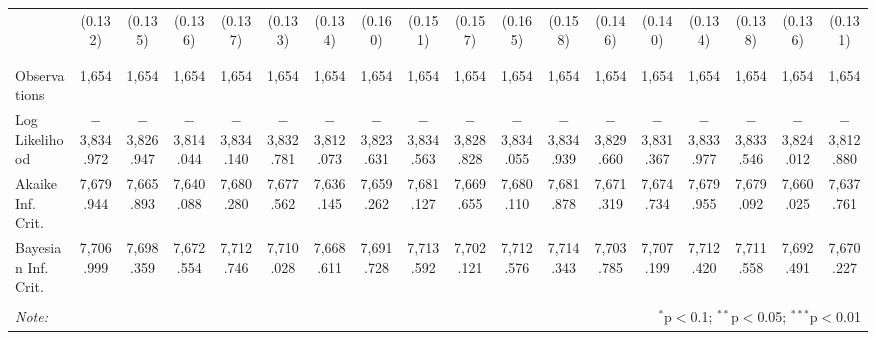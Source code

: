 \begin{table}[!htbp]
\begin{tabular}{@{\extracolsep{5pt}}lccccccccccccccccc}
  & (0.132) & (0.135) & (0.136) & (0.137) & (0.133) & (0.134) & (0.160) & (0.151) & (0.157) & (0.165) & (0.158) & (0.146) & (0.140) & (0.134) & (0.138) & (0.136) & (0.131) \\ 
  & & & & & & & & & & & & & & & & & \\ 
\hline \\[-1.8ex] 
Observations & 1,654 & 1,654 & 1,654 & 1,654 & 1,654 & 1,654 & 1,654 & 1,654 & 1,654 & 1,654 & 1,654 & 1,654 & 1,654 & 1,654 & 1,654 & 1,654 & 1,654 \\ 
Log Likelihood & $-$3,834.972 & $-$3,826.947 & $-$3,814.044 & $-$3,834.140 & $-$3,832.781 & $-$3,812.073 & $-$3,823.631 & $-$3,834.563 & $-$3,828.828 & $-$3,834.055 & $-$3,834.939 & $-$3,829.660 & $-$3,831.367 & $-$3,833.977 & $-$3,833.546 & $-$3,824.012 & $-$3,812.880 \\ 
Akaike Inf. Crit. & 7,679.944 & 7,665.893 & 7,640.088 & 7,680.280 & 7,677.562 & 7,636.145 & 7,659.262 & 7,681.127 & 7,669.655 & 7,680.110 & 7,681.878 & 7,671.319 & 7,674.734 & 7,679.955 & 7,679.092 & 7,660.025 & 7,637.761 \\ 
Bayesian Inf. Crit. & 7,706.999 & 7,698.359 & 7,672.554 & 7,712.746 & 7,710.028 & 7,668.611 & 7,691.728 & 7,713.592 & 7,702.121 & 7,712.576 & 7,714.343 & 7,703.785 & 7,707.199 & 7,712.420 & 7,711.558 & 7,692.491 & 7,670.227 \\ 
\hline 
\hline \\[-1.8ex] 
\textit{Note:}  & \multicolumn{17}{r}{$^{*}$p$<$0.1; $^{**}$p$<$0.05; $^{***}$p$<$0.01} \\ 
\end{tabular} 
\end{table} 
